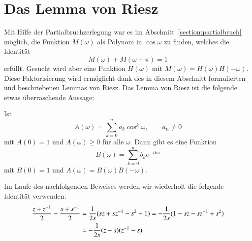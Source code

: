 %
%
%

%
%
\section{Das Lemma von Riesz\label{section:riesz}}
Mit Hilfe der Partialbruchzerlegung war es im
Abschnitt~\ref{section:partialbruch}
möglich, die Funktion $M(\omega)$ als Polynom in $\cos\omega$ zu finden,
welches die Identität
\[
M(\omega) + M(\omega + \pi) = 1
\]
erfüllt.
Gesucht wird aber eine Funktion $H(\omega)$ mit
$M(\omega)=H(\omega)H(-\omega)$.
Diese Faktorisierung wird ermöglicht dank des in diesem Abschnitt
formulierten und beschriebenen Lemmas von Riesz.
Das Lemma von Riesz ist die folgende etwas überraschende Aussage:

\begin{lemma}[Riesz]
\label{lemma:riesz}
Ist
\[
A(\omega)
=
\sum_{k=0}^n
a_k \cos^k \omega,
\qquad
a_n\ne 0
\]
mit $A(0)=1$ und $A(\omega)\ge 0$ für alle $\omega$.
Dann gibt es eine Funktion
\[
B(\omega)
=
\sum_{k=0}^n b_ke^{-ik\omega}
\]
mit $B(0)=1$ und $A(\omega)=B(\omega)B(-\omega)$.
\end{lemma}

Im Laufe des nachfolgenden Beweises werden wir wiederholt die folgende
Identität verwenden:
\begin{align}
\frac{z+z^{-1}}2-\frac{s+s^{-1}}2
&=
\frac1{2s}(sz+sz^{-1}-s^2-1)
=
-
\frac1{2s}(1-sz-sz^{-1}+s^2)
\notag
\\
&=
-
\frac1{2s}(z-s)(z^{-1}-s)
\label{buch:kompakt:cosh}
\end{align}

